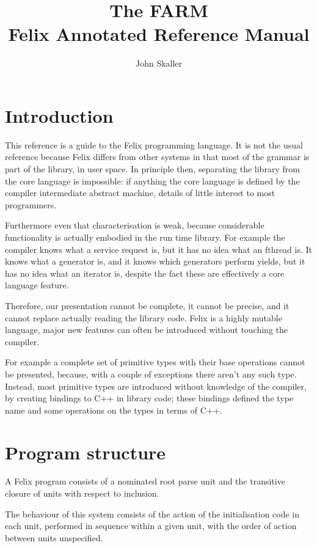 \documentclass[oneside]{book}
\title{The FARM\\ Felix Annotated Reference Manual}
\author{John Skaller}
\begin{document}
\maketitle
\tableofcontents
\chapter{Introduction}
This reference is a guide to the Felix programming language.
It is not the usual reference because Felix differs from
other systems in that most of the grammar is part of the library,
in user space. In principle then, separating the library from the 
core language is impossible: if anything the core language is
defined by the compiler intermediate abstract machine, details
of little interest to most programmers.

Furthermore even that characterisation is weak, because considerable
functionality is actually embodied in the run time library. For example
the compiler knows what a service request is, but it has no idea
what an fthread is. It knows what a generator is, and it knows which
generators perform yields, but it has no idea what an iterator is,
despite the fact these are effectively a core language feature.

Therefore, our presentation cannot be complete, it cannot be precise,
and it cannot replace actually reading the library code. Felix is a highly
mutable language, major new features can often be introduced without
touching the compiler.

For example a complete set of primitive types with their base
operations cannot be presented, because, with a couple of exceptions
there aren't any such type. Instead, most primitive types are introduced
without knowledge of the compiler, by creating bindings to C++ in 
library code; these bindings defined the type name and some operations
on the types in terms of C++.


\chapter{Program structure}
A Felix program consists of a nominated root parse unit and
the transitive closure of units with respect to inclusion.

The behaviour of this system consists of the action of the
initialisation code in each unit, performed in sequence
within a given unit, with the order of action between
units unspecified.
\end{document}

